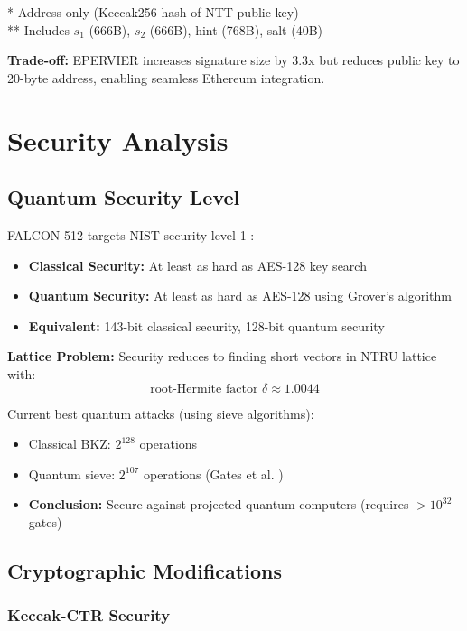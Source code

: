\documentclass[11pt,a4paper]{article}
\begin{document}
* Address only (Keccak256 hash of NTT public key) \\
** Includes $s_1$ (666B), $s_2$ (666B), hint (768B), salt (40B)

\textbf{Trade-off:} EPERVIER increases signature size by 3.3x but reduces public key to 20-byte address, enabling seamless Ethereum integration.

\section{Security Analysis}

\subsection{Quantum Security Level}

FALCON-512 targets NIST security level 1 \cite{nist2016submission}:
\begin{itemize}
    \item \textbf{Classical Security:} At least as hard as AES-128 key search
    \item \textbf{Quantum Security:} At least as hard as AES-128 using Grover's algorithm
    \item \textbf{Equivalent:} 143-bit classical security, 128-bit quantum security
\end{itemize}

\textbf{Lattice Problem:} Security reduces to finding short vectors in NTRU lattice with:
\begin{equation}
\text{root-Hermite factor } \delta \approx 1.0044
\end{equation}

Current best quantum attacks (using sieve algorithms):
\begin{itemize}
    \item Classical BKZ: $2^{128}$ operations
    \item Quantum sieve: $2^{107}$ operations (Gates et al. \cite{gates2019estimating})
    \item \textbf{Conclusion:} Secure against projected quantum computers (requires $>10^{32}$ gates)
\end{itemize}

\subsection{Cryptographic Modifications}

\subsubsection{Keccak-CTR Security}
\end{document}
